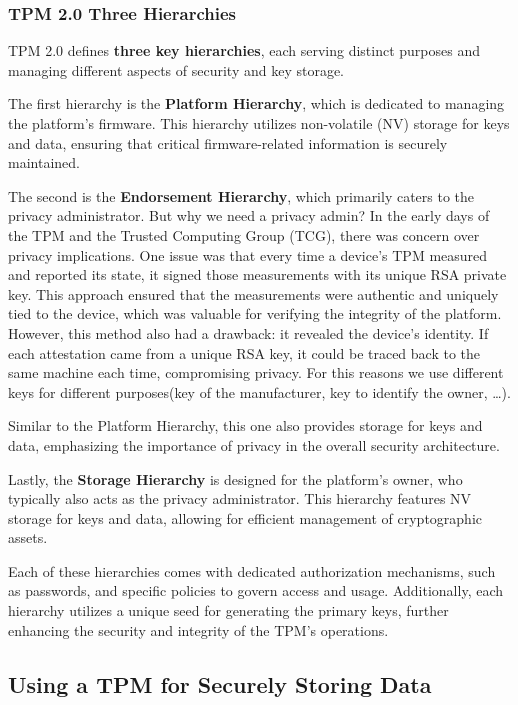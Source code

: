 \subsubsection{TPM 2.0 Three Hierarchies}

TPM 2.0 defines \textbf{three key hierarchies}, each serving distinct
purposes and managing different aspects of security and key storage.

The first hierarchy is the \textbf{Platform Hierarchy}, which is
dedicated to managing the platform’s firmware. This hierarchy utilizes
non-volatile (NV) storage for keys and data, ensuring that critical
firmware-related information is securely maintained.

The second is the \textbf{Endorsement Hierarchy}, which primarily
caters to the privacy administrator. But why we need a privacy admin?
In the early days of the TPM and the Trusted Computing Group (TCG),
there was concern over privacy implications. One issue was that every
time a device’s TPM measured and reported its state, it signed those
measurements with its unique RSA private key. This approach ensured
that the measurements were authentic and uniquely tied to the device,
which was valuable for verifying the integrity of the platform.
However, this method also had a drawback: it revealed the device’s
identity.
If each attestation came from a unique RSA key, it could be traced
back to the same machine each time, compromising privacy.
For this reasons we use different keys for different purposes(key of
the manufacturer, key to identify the owner, \ldots).

Similar to the Platform
Hierarchy, this one also provides storage for keys and data,
emphasizing the importance of privacy in the overall security
architecture.

Lastly, the \textbf{Storage Hierarchy} is designed for the platform’s
owner, who typically also acts as the privacy administrator. This
hierarchy features NV storage for keys and data, allowing for
efficient management of cryptographic assets.

Each of these hierarchies comes with dedicated authorization
mechanisms, such as passwords, and specific policies to govern access
and usage. Additionally, each hierarchy utilizes a unique seed for
generating the primary keys, further enhancing the security and
integrity of the TPM's operations.

\subsection{Using a TPM for Securely Storing Data}


